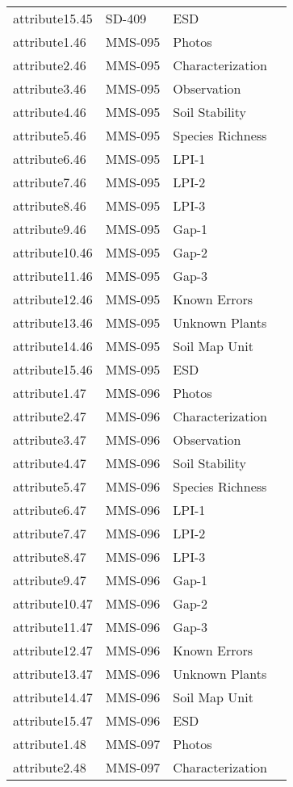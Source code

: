 \documentclass[
]{article}
\begin{document}
\begin{longtable}[]{@{}llll@{}}
attribute15.45 & SD-409 & ESD & \\
attribute1.46 & MMS-095 & Photos & \\
attribute2.46 & MMS-095 & Characterization & \\
attribute3.46 & MMS-095 & Observation & \\
attribute4.46 & MMS-095 & Soil Stability & \\
attribute5.46 & MMS-095 & Species Richness & \\
attribute6.46 & MMS-095 & LPI-1 & \\
attribute7.46 & MMS-095 & LPI-2 & \\
attribute8.46 & MMS-095 & LPI-3 & \\
attribute9.46 & MMS-095 & Gap-1 & \\
attribute10.46 & MMS-095 & Gap-2 & \\
attribute11.46 & MMS-095 & Gap-3 & \\
attribute12.46 & MMS-095 & Known Errors & \\
attribute13.46 & MMS-095 & Unknown Plants & \\
attribute14.46 & MMS-095 & Soil Map Unit & \\
attribute15.46 & MMS-095 & ESD & \\
attribute1.47 & MMS-096 & Photos & \\
attribute2.47 & MMS-096 & Characterization & \\
attribute3.47 & MMS-096 & Observation & \\
attribute4.47 & MMS-096 & Soil Stability & \\
attribute5.47 & MMS-096 & Species Richness & \\
attribute6.47 & MMS-096 & LPI-1 & \\
attribute7.47 & MMS-096 & LPI-2 & \\
attribute8.47 & MMS-096 & LPI-3 & \\
attribute9.47 & MMS-096 & Gap-1 & \\
attribute10.47 & MMS-096 & Gap-2 & \\
attribute11.47 & MMS-096 & Gap-3 & \\
attribute12.47 & MMS-096 & Known Errors & \\
attribute13.47 & MMS-096 & Unknown Plants & \\
attribute14.47 & MMS-096 & Soil Map Unit & \\
attribute15.47 & MMS-096 & ESD & \\
attribute1.48 & MMS-097 & Photos & \\
attribute2.48 & MMS-097 & Characterization & \\

\end{longtable}
\end{document}
